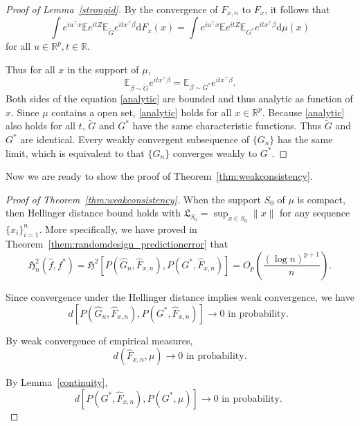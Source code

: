 \documentclass[11pt]{article}
\numberwithin{equation}{section}
\newcommand{\RS}{\mathbb{R}}
\newcommand{\T}{ \top }
\newcommand{\lipsz}{\mathfrak{L}}
\newcommand{\E}{\mathbb{E}}
\begin{document}
\begin{appendices}
\begin{proof}[Proof of Lemma~\ref{strongid}]
By the convergence of $F_{x,n}$ to $F_x$, it follows that
\[
\int e^{iu^\T x} \E e^{itZ} \E_{\tilde{G}}e^{itx^\T \beta} \mathrm{d} F_{x}(x) = \int e^{iu^\T x} \E e^{itZ} \E_{G^*}e^{itx^\T \beta} \mathrm{d} \mu(x)
\]
for all $u \in \RS^p, t \in \RS$.

Thus for all $x$ in the support of $\mu$, 
\begin{equation}
\E_{\beta\sim \tilde{G}}e^{itx^\T \beta}  = \E_{\beta \sim G^*}e^{itx^\T \beta}.
\label{analytic}
\end{equation}
Both sides of the equation \eqref{analytic} are bounded and thus analytic as function of $x$. Since $\mu$ contains a open set, \eqref{analytic} holds for all $x \in \RS^p$. Because \eqref{analytic} also holds for all $t$, $\tilde{G}$ and $G^*$ have the same characteristic functions. Thus $\tilde{G}$ and $G^*$ are identical. Every weakly convergent subsequence of $\{G_n\}$ has the same limit, which is equivalent to that $\{G_n\}$ converges weakly to $G^*$.

\end{proof}

Now we are ready to show the proof of Theorem~\ref{thm:weakconsistency}.

\begin{proof}[Proof of Theorem~\ref{thm:weakconsistency}]

When the support $S_0$ of $\mu$ is compact, then Hellinger distance bound holds with $\lipsz_{S_0} = \sup_{x\in S_0} \| x\|$ for any sequence $\{x_i\}_{i=1}^n$. More specifically, we have proved in Theorem~\ref{them:randomdesign_predictionerror} that
\[
\mathfrak{H}_n^2 (\hat{f}, f^*) = \mathfrak{H}^2[P(\hat{G}_n, \hat{F}_{x,n}), P(G^*, \hat{F}_{x,n})] = O_p\left(\frac{(\log n)^{p+1}}{n}\right).
\]

Since convergence under the Hellinger distance implies weak convergence, we have
\begin{equation}
\label{consist1}
d[P(\hat{G}_n, \hat{F}_{x,n}), P(G^*, \hat{F}_{x,n})] \rightarrow 0 \text{ in probability. }
\end{equation}

By weak convergence of empirical measures,
\[
d(\hat{F}_{x,n}, \mu) \rightarrow 0 \text{ in probability}.
\]

By Lemma~\ref{continuity},
\begin{equation}
\label{consist2}
d[P(G^*, \hat{F}_{x,n}),P(G^*, \mu)] \rightarrow 0 \text{ in probability. }
\end{equation}


\end{proof}
\end{appendices}
\end{document}
